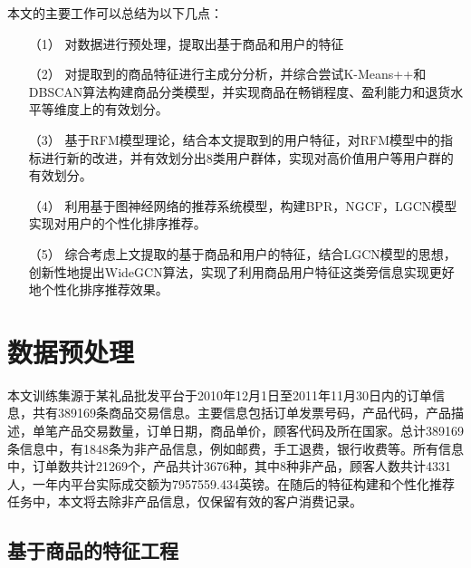 \documentclass[lang=cn,11pt,a4paper,cite=authoryear]{elegantpaper}
\begin{document}
本文的主要工作可以总结为以下几点：

\begin{itemize}
  \item [（1）] 
  对数据进行预处理，提取出基于商品和用户的特征
  \item [（2）]
  对提取到的商品特征进行主成分分析，并综合尝试K-Means++和DBSCAN算法构建商品分类模型，并实现商品在畅销程度、盈利能力和退货水平等维度上的有效划分。
  \item [（3）]
  基于RFM模型理论，结合本文提取到的用户特征，对RFM模型中的指标进行新的改进，并有效划分出8类用户群体，实现对高价值用户等用户群的有效划分。
  \item[（4）]
  利用基于图神经网络的推荐系统模型，构建BPR，NGCF，LGCN模型实现对用户的个性化排序推荐。
  \item[（5）]
  综合考虑上文提取的基于商品和用户的特征，结合LGCN模型的思想，创新性地提出WideGCN算法，实现了利用商品用户特征这类旁信息实现更好地个性化排序推荐效果。 
\end{itemize}

\section{数据预处理}

本文训练集源于某礼品批发平台于2010年12月1日至2011年11月30日内的订单信息，共有389169条商品交易信息。主要信息包括订单发票号码，产品代码，产品描述，单笔产品交易数量，订单日期，商品单价，顾客代码及所在国家。总计389169条信息中，有1848条为非产品信息，例如邮费，手工退费，银行收费等。所有信息中，订单数共计21269个，产品共计3676种，其中8种非产品，顾客人数共计4331人，一年内平台实际成交额为7957559.434英镑。在随后的特征构建和个性化推荐任务中，本文将去除非产品信息，仅保留有效的客户消费记录。

\subsection{基于商品的特征工程}
\end{document}
